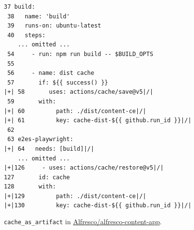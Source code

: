 \begin{figure}[!htbp]
\centering
\begin{lstlisting}[style=ccscase]
 37 build:
 38   name: 'build'
 39   runs-on: ubuntu-latest
 40   steps:
    ... omitted ...
 54     - run: npm run build -- $BUILD_OPTS
 55 
 56     - name: dist cache
 57       if: ${{ success() }}
|+| 58       uses: actions/cache/save@v5|/|
 59       with:
|+| 60         path: ./dist/content-ce|/|
|+| 61         key: cache-dist-${{ github.run_id }}|/|
 62 
 63 e2es-playwright:
|+| 64   needs: [build]|/|
    ... omitted ...
|+|126     - uses: actions/cache/restore@v5|/|
127       id: cache
128       with:
|+|129         path: ./dist/content-ce|/|
|+|130         key: cache-dist-${{ github.run_id }}|/|
\end{lstlisting}
\caption{\texttt{cache\_as\_artifact} in \href{https://github.com/Alfresco/alfresco-content-app/blob/85366003b55caa86719efe288c51ebb96665afa0/.github/workflows/run-e2e-with-env.yml}{Alfresco/alfresco-content-app}.}
\label{fig:ccs-transfer}
\end{figure}
